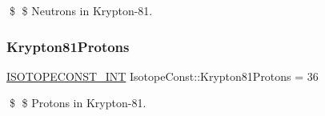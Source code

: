 \$ \$ Neutrons in Krypton-\/81. \mbox{\label{group___isotope_const-_krypton-_kr81_gaa2b19548bb97492fd10bbd0422469759}} 
\subsubsection{\texorpdfstring{Krypton81\+Protons}{Krypton81Protons}}
{\footnotesize\ttfamily \mbox{\hyperlink{group___isotope_const-_macros_ga5f18360b3e99483a35c32d789e62621c}{I\+S\+O\+T\+O\+P\+E\+C\+O\+N\+S\+T\+\_\+\+I\+NT}} Isotope\+Const\+::\+Krypton81\+Protons = 36}

\$ \$ Protons in Krypton-\/81. 